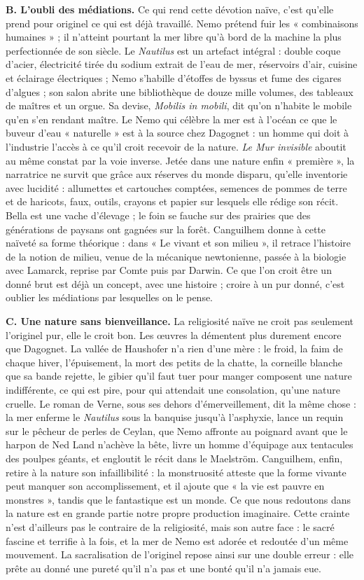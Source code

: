\documentclass[11pt,a4paper]{article}
\begin{document}
\textbf{B. L'oubli des médiations.} Ce qui rend cette dévotion naïve, c'est qu'elle prend pour originel ce qui est déjà travaillé. Nemo prétend fuir les « combinaisons humaines » ; il n'atteint pourtant la mer libre qu'à bord de la machine la plus perfectionnée de son siècle. Le \emph{Nautilus} est un artefact intégral : double coque d'acier, électricité tirée du sodium extrait de l'eau de mer, réservoirs d'air, cuisine et éclairage électriques ; Nemo s'habille d'étoffes de byssus et fume des cigares d'algues ; son salon abrite une bibliothèque de douze mille volumes, des tableaux de maîtres et un orgue. Sa devise, \emph{Mobilis in mobili}, dit qu'on n'habite le mobile qu'en s'en rendant maître. Le Nemo qui célèbre la mer est à l'océan ce que le buveur d'eau « naturelle » est à la source chez Dagognet : un homme qui doit à l'industrie l'accès à ce qu'il croit recevoir de la nature. \emph{Le Mur invisible} aboutit au même constat par la voie inverse. Jetée dans une nature enfin « première », la narratrice ne survit que grâce aux réserves du monde disparu, qu'elle inventorie avec lucidité : allumettes et cartouches comptées, semences de pommes de terre et de haricots, faux, outils, crayons et papier sur lesquels elle rédige son récit. Bella est une vache d'élevage ; le foin se fauche sur des prairies que des générations de paysans ont gagnées sur la forêt. Canguilhem donne à cette naïveté sa forme théorique : dans « Le vivant et son milieu », il retrace l'histoire de la notion de milieu, venue de la mécanique newtonienne, passée à la biologie avec Lamarck, reprise par Comte puis par Darwin. Ce que l'on croit être un donné brut est déjà un concept, avec une histoire ; croire à un pur donné, c'est oublier les médiations par lesquelles on le pense.

\textbf{C. Une nature sans bienveillance.} La religiosité naïve ne croit pas seulement l'originel pur, elle le croit bon. Les œuvres la démentent plus durement encore que Dagognet. La vallée de Haushofer n'a rien d'une mère : le froid, la faim de chaque hiver, l'épuisement, la mort des petits de la chatte, la corneille blanche que sa bande rejette, le gibier qu'il faut tuer pour manger composent une nature indifférente, ce qui est pire, pour qui attendait une consolation, qu'une nature cruelle. Le roman de Verne, sous ses dehors d'émerveillement, dit la même chose : la mer enferme le \emph{Nautilus} sous la banquise jusqu'à l'asphyxie, lance un requin sur le pêcheur de perles de Ceylan, que Nemo affronte au poignard avant que le harpon de Ned Land n'achève la bête, livre un homme d'équipage aux tentacules des poulpes géants, et engloutit le récit dans le Maelström. Canguilhem, enfin, retire à la nature son infaillibilité : la monstruosité atteste que la forme vivante peut manquer son accomplissement, et il ajoute que « la vie est pauvre en monstres », tandis que le fantastique est un monde. Ce que nous redoutons dans la nature est en grande partie notre propre production imaginaire. Cette crainte n'est d'ailleurs pas le contraire de la religiosité, mais son autre face : le sacré fascine et terrifie à la fois, et la mer de Nemo est adorée et redoutée d'un même mouvement. La sacralisation de l'originel repose ainsi sur une double erreur : elle prête au donné une pureté qu'il n'a pas et une bonté qu'il n'a jamais eue.
\end{document}
